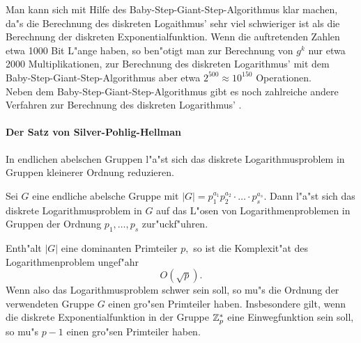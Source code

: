 Man kann sich mit Hilfe des Baby-Step-Giant-Step-Algorithmus klar machen, da"s die Berechnung des diskreten Logaithmus' sehr viel schwieriger ist als die Berechnung der diskreten Exponentialfunktion. Wenn die auftretenden Zahlen etwa 1000 Bit L"ange haben, so ben"otigt man zur Berechnung von $ g^k $ nur etwa 2000 Multiplikationen, zur Berechnung des diskreten Logarithmus' mit dem Baby-Step-Giant-Step-Algorithmus aber etwa $ 2^{500} \approx 10^{150} $ Operationen. \\
Neben dem Baby-Step-Giant-Step-Algorithmus gibt es noch zahlreiche andere Verfahren zur Berechnung des diskreten Logarithmus' \cite{Stinson1995}.

\paragraph{Der Satz von Silver-Pohlig-Hellman}
In endlichen abelschen Gruppen l"a"st sich das  diskrete Logarithmusproblem in Gruppen kleinerer Ordnung reduzieren.
\begin{satz}\label{thm-cry-pohe}
Sei $ G $ eine endliche abelsche Gruppe mit $ |G|= p_1^{a_1} p_2^{a_2} \cdot \ldots \cdot p_s^{a_s}. $ Dann l"a"st sich das diskrete Logarithmusproblem in $ G $ auf das L"osen von Logarithmenproblemen in Gruppen der Ordnung $ p_1, \ldots , p_s $ zur"uckf"uhren.
\end{satz}

Enth"alt $ |G| $ eine \glqq dominanten\grqq {} Primteiler $ p ,$ so ist die Komplexit"at  des Logarithmenproblem ungef"ahr
\[ O(\sqrt{p}). \]
Wenn also das Logarithmusproblem schwer sein soll, so mu"s die Ordnung der verwendeten Gruppe $ G $ einen gro"sen Primteiler haben. Insbesondere gilt, wenn die diskrete Exponentialfunktion in der Gruppe $ \mathbf{\mathbb{Z}}_p^{\ast} $ eine Einwegfunktion sein soll, so mu"s $ p -1 $ einen gro"sen Primteiler haben.


\begin{center}
\end{center}


